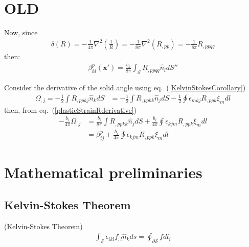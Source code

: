 \documentclass[10pt]{report}
\begin{document}
{%


\section{OLD}

Now, since 
\begin{align}
\delta(R)=-\frac{1}{4\pi}\nabla^2\left(\frac{1}{R}\right)=-\frac{1}{8\pi}\nabla^2(R_{,pp})=-\frac{1}{8\pi}R_{,ppqq}
\end{align}
then:
\begin{align}
\beta^p_{kl}(\bm x')=\frac{b_k}{8\pi}\int_\mathcal{S} R_{,ppqq}\hat{n}_ldS''
\label{plasticStrainRderivative}
\end{align}



Consider the derivative of the solid angle using eq.~(\ref{KelvinStokesCorollary})
\begin{align}
\Omega_{,j}=-\frac{1}{2}\int R_{,ppkj}\hat{n}_kdS&=-\frac{1}{2}\int R_{,ppkk}\hat{n}_jdS-\frac{1}{2}\oint\epsilon_{mkj}R_{,ppk}\xi_mdl
\end{align}
then, from eq.~(\ref{plasticStrainRderivative})
\begin{align}
-\frac{b_i}{4\pi}\Omega_{,j}&=\frac{b_i}{8\pi}\int R_{,ppkk}\hat{n}_jdS+\frac{b_i}{4\pi}\oint\epsilon_{kjm}R_{,ppk}\xi_mdl\nonumber\\
&=\beta^p_{ij}+\frac{b_i}{4\pi}\oint\epsilon_{kjm}R_{,ppk}\xi_mdl
\end{align}






\appendix
\section{Mathematical preliminaries}

\subsection{Kelvin-Stokes Theorem}
\begin{mytheorem} (Kelvin-Stokes Theorem)
\begin{align}
\int_\mathcal{S} \epsilon_{ikl}f_{,l}\hat{n}_kds=\oint_{\partial\mathcal{S}} f dl_i
\label{KelvinStokes}
\end{align}
\end{mytheorem}

}
\end{document}
